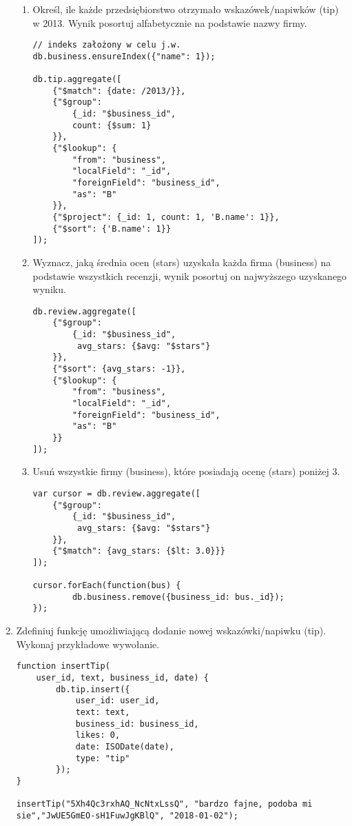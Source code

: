 \documentclass[a4paper,9pt]{extarticle}	%
\begin{document}
\begin{enumerate}
\begin{enumerate}
	  \item Określ, ile każde przedsiębiorstwo otrzymało wskazówek/napiwków (tip) w 2013. Wynik posortuj alfabetycznie na podstawie nazwy firmy.
	  \begin{lstlisting}
// indeks założony w celu j.w.
db.business.ensureIndex({"name": 1});

db.tip.aggregate([
    {"$match": {date: /2013/}},
    {"$group": 
        {_id: "$business_id",
        count: {$sum: 1}        
    }},
    {"$lookup": {
        "from": "business",
        "localField": "_id",
        "foreignField": "business_id",
        "as": "B"
    }},
    {"$project": {_id: 1, count: 1, 'B.name': 1}},
    {"$sort": {'B.name': 1}}
]);
	  \end{lstlisting}
\newpage
	  \item Wyznacz, jaką średnia ocen (stars) uzyskała każda firma (business) na podstawie wszystkich recenzji, wynik posortuj on najwyższego uzyskanego wyniku.
	  \begin{lstlisting}
db.review.aggregate([
    {"$group":
        {_id: "$business_id",
         avg_stars: {$avg: "$stars"}
    }},
    {"$sort": {avg_stars: -1}},
    {"$lookup": {
        "from": "business",
        "localField": "_id",
        "foreignField": "business_id",
        "as": "B"
    }}
]);
	  \end{lstlisting}
	  
	  \item Usuń wszystkie firmy (business), które posiadają ocenę (stars) poniżej 3.
	  \begin{lstlisting}
var cursor = db.review.aggregate([
    {"$group":
        {_id: "$business_id",
         avg_stars: {$avg: "$stars"}
    }},
    {"$match": {avg_stars: {$lt: 3.0}}}
]);

cursor.forEach(function(bus) {
        db.business.remove({business_id: bus._id});
});
	  \end{lstlisting}
	\end{enumerate}
	
	\item Zdefiniuj funkcję umożliwiającą dodanie nowej wskazówki/napiwku (tip). Wykonaj przykładowe wywołanie.
	\begin{lstlisting}
function insertTip(
    user_id, text, business_id, date) {
        db.tip.insert({
            user_id: user_id,
            text: text,
            business_id: business_id,
            likes: 0,
            date: ISODate(date),
            type: "tip"
        });
}

insertTip("5Xh4Qc3rxhAQ_NcNtxLssQ", "bardzo fajne, podoba mi sie","JwUE5GmEO-sH1FuwJgKBlQ", "2018-01-02");
	\end{lstlisting}
	

\end{enumerate}
\end{document}
